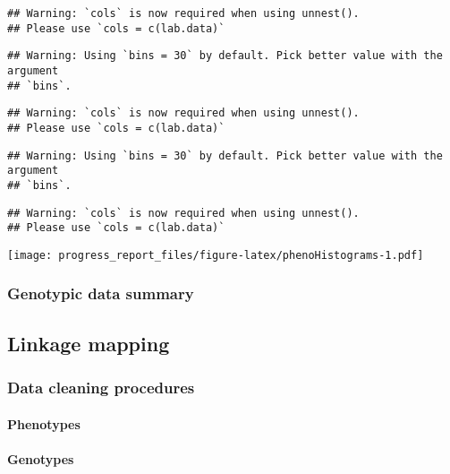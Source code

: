 \documentclass[
]{article}
\begin{document}
\begin{verbatim}
## Warning: `cols` is now required when using unnest().
## Please use `cols = c(lab.data)`
\end{verbatim}

\begin{verbatim}
## Warning: Using `bins = 30` by default. Pick better value with the argument
## `bins`.
\end{verbatim}

\begin{verbatim}
## Warning: `cols` is now required when using unnest().
## Please use `cols = c(lab.data)`
\end{verbatim}

\begin{verbatim}
## Warning: Using `bins = 30` by default. Pick better value with the argument
## `bins`.
\end{verbatim}

\begin{verbatim}
## Warning: `cols` is now required when using unnest().
## Please use `cols = c(lab.data)`
\end{verbatim}

\texttt{[image: progress\_report\_files/figure-latex/phenoHistograms-1.pdf]}

\hypertarget{genotypic-data-summary}{%
\subsubsection{Genotypic data summary}\label{genotypic-data-summary}}

\hypertarget{linkage-mapping}{%
\subsection{Linkage mapping}\label{linkage-mapping}}

\hypertarget{data-cleaning-procedures}{%
\subsubsection{Data cleaning
procedures}\label{data-cleaning-procedures}}

\hypertarget{phenotypes}{%
\paragraph{Phenotypes}\label{phenotypes}}

\hypertarget{genotypes}{%
\paragraph{Genotypes}\label{genotypes}}
\end{document}
